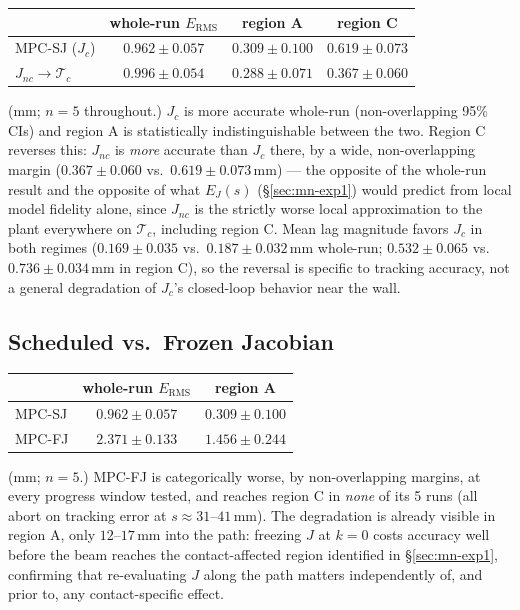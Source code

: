 \documentclass[journal]{IEEEtran}
\begin{document}
\begin{center}
\begin{tabular}{@{}lccc@{}}
\toprule
& whole-run $E_{\mathrm{RMS}}$ & region A & region C \\
\midrule
MPC-SJ ($J_c$) & $0.962\pm0.057$ & $0.309\pm0.100$ & $0.619\pm0.073$ \\
$J_{nc}\!\to\!\mathcal{T}_c$ & $0.996\pm0.054$ & $0.288\pm0.071$ & $\mathbf{0.367\pm0.060}$ \\
\bottomrule
\end{tabular}
\end{center}
(mm; $n=5$ throughout.) $J_c$ is more accurate whole-run (non-overlapping
95\% CIs) and region A is statistically indistinguishable between the
two. Region C reverses this: $J_{nc}$ is \emph{more} accurate than
$J_c$ there, by a wide, non-overlapping margin ($0.367\pm0.060$ vs.\
$0.619\pm0.073\,\mathrm{mm}$) --- the opposite of the whole-run result
and the opposite of what $E_J(s)$ (\S\ref{sec:mn-exp1}) would predict
from local model fidelity alone, since $J_{nc}$ is the strictly worse
local approximation to the plant everywhere on $\mathcal{T}_c$,
including region C. Mean lag magnitude favors $J_c$ in both regimes
($0.169\pm0.035$ vs.\ $0.187\pm0.032\,\mathrm{mm}$ whole-run;
$0.532\pm0.065$ vs.\ $0.736\pm0.034\,\mathrm{mm}$ in region C), so the
reversal is specific to tracking accuracy, not a general degradation
of $J_c$'s closed-loop behavior near the wall.

\subsection{Scheduled vs.\ Frozen Jacobian}
\label{sec:hw-exp2}

\begin{center}
\begin{tabular}{@{}lcc@{}}
\toprule
& whole-run $E_{\mathrm{RMS}}$ & region A \\
\midrule
MPC-SJ & $0.962\pm0.057$ & $0.309\pm0.100$ \\
MPC-FJ & $2.371\pm0.133$ & $1.456\pm0.244$ \\
\bottomrule
\end{tabular}
\end{center}
(mm; $n=5$.) MPC-FJ is categorically worse, by non-overlapping margins,
at every progress window tested, and reaches region C in \emph{none}
of its 5 runs (all abort on tracking error at $s\approx31$--$41\,\mathrm{mm}$).
The degradation is already visible in region A, only
$12$--$17\,\mathrm{mm}$ into the path: freezing $J$ at $k{=}0$ costs
accuracy well before the beam reaches the contact-affected region
identified in \S\ref{sec:mn-exp1}, confirming that re-evaluating $J$
along the path matters independently of, and prior to, any
contact-specific effect.
\end{document}
